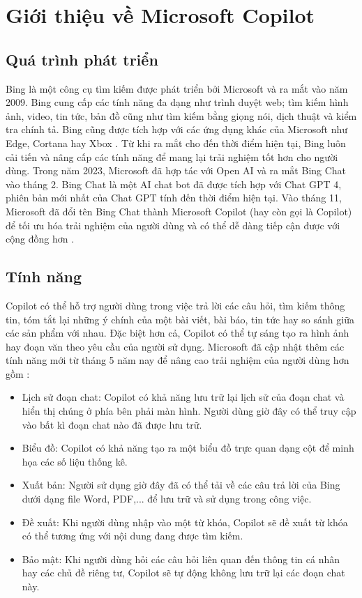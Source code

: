 \chapter{Giới thiệu về Microsoft Copilot}
\section{Quá trình phát triển}
Bing là một công cụ tìm kiếm được phát triển bởi Microsoft và ra mắt vào năm 2009. Bing cung cấp
các tính năng đa dạng như trình duyệt web; tìm kiếm hình ảnh, video, tin tức, bản đồ cũng như tìm kiếm bằng giọng nói, dịch thuật và kiểm tra chính tả.
Bing cũng được tích hợp với các ứng dụng khác của Microsoft như Edge, Cortana hay Xbox \cite{link_1}. Từ khi ra mắt cho đến thời điểm hiện tại, Bing luôn cải tiến và nâng cấp
các tính năng để mang lại trải nghiệm tốt hơn cho người dùng. Trong năm 2023, Microsoft đã hợp tác với Open AI và ra mắt Bing Chat vào tháng 2. Bing Chat là một AI chat bot đã được tích hợp với
Chat GPT 4, phiên bản mới nhất của Chat GPT tính đến thời điểm hiện tại. Vào tháng 11, Microsoft đã đổi tên Bing Chat thành Microsoft Copilot (hay còn gọi là Copilot) để tối ưu hóa trải nghiệm của người dùng và có thể
dễ dàng tiếp cận được với cộng đồng hơn \cite{link_2}.
\section{Tính năng}
Copilot có thể hỗ trợ người dùng trong việc trả lời các câu hỏi, tìm kiếm thông tin,
tóm tắt lại những ý chính của một bài viết, bài báo, tin tức hay so sánh giữa các sản phẩm với nhau.
Đặc biệt hơn cả, Copilot có thể tự sáng tạo ra hình ảnh hay đoạn văn theo yêu cầu của người sử dụng\cite{link_3}. Microsoft đã cập nhật thêm các tính năng mới từ tháng 5 năm nay để nâng cao trải nghiệm của người dùng hơn gồm \cite{link_4}:
\begin{itemize}
    \item Lịch sử đoạn chat: Copilot có khả năng lưu trữ lại lịch sử của đoạn chat và hiển thị chúng ở phía bên phải màn hình. Người dùng giờ đây có thể truy cập vào bất kì đoạn chat nào đã được lưu trữ.
    \item Biểu đồ: Copilot có khả năng tạo ra một biểu đồ trực quan dạng cột để minh họa các số liệu thống kê.
    \item Xuất bản: Người sử dụng giờ đây đã có thể tải về các câu trả lời của Bing dưới dạng file Word, PDF,... để lưu trữ và sử dụng trong công việc.
    \item Đề xuất: Khi người dùng nhập vào một từ khóa, Copilot sẽ đề xuất từ khóa có thể tương ứng với nội dung đang được tìm kiếm.
    \item Bảo mật: Khi người dùng hỏi các câu hỏi liên quan đến thông tin cá nhân hay các chủ đề riêng tư, Copilot sẽ tự động không lưu trữ lại các đoạn chat này.
\end{itemize}
